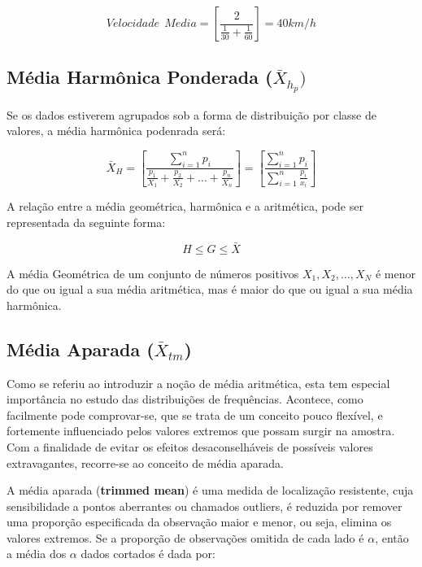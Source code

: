 \begin{equation}\label{exemplo_harmonica}
Velocidade \ \  Media = \left[\frac{2}{\frac{1}{30}+\frac{1}{60}} \right ]= 40 km/h
\end{equation}


\subsection{Média Harmônica Ponderada ($\bar{X}_{h_{p}})$}


Se os dados estiverem agrupados sob a forma de distribuição por classe de valores, a média harmônica podenrada será:


\begin{equation}\label{harmonicapondrada}
    \bar{X}_{H}= \left[  \frac{\sum_{i=1}^{n}p_{i}}{\frac{p_{1}}{X_{1}}+\frac{p_{2}}{X_{2}}+\ldots+\frac{p_{n}}{X_{n}}}\right ] = \left[  \frac{\sum_{i=1}^{n}p_{i}}{\sum_{i=1}^{n}\frac{p_{i}}{x_{i}}} \right ]
\end{equation}


A relação entre a média geométrica, harmônica e a aritmética, pode ser representada da seguinte forma:

        $$ H \leq G \leq \bar{X}  $$

A média Geométrica de um conjunto de números positivos $X_{1},X_{2},\ldots,X_{N}$ é menor do que ou igual a sua média aritmética, mas é maior do que ou igual a sua média harmônica.


\subsection{Média Aparada ($\bar{X}_{tm}$)}


\inic Como se referiu ao introduzir a noção de média aritmética, esta tem especial
importância no estudo das distribuições de frequências.
Acontece, como facilmente pode comprovar-se, que se trata de um conceito
pouco flexível, e fortemente influenciado pelos valores extremos que possam surgir na
amostra. Com a finalidade de evitar os efeitos desaconselháveis de possíveis valores
extravagantes, recorre-se ao conceito de média aparada. \vskip0.3cm


A média aparada (\textbf{trimmed mean}) é uma medida de localização resistente, cuja sensibilidade a pontos aberrantes ou chamados outliers, é reduzida por remover uma proporção especificada da observação maior e menor, ou seja, elimina os valores extremos. Se a proporção de observações omitida de cada lado é $\alpha$, então a média dos $\alpha$ dados cortados é dada por:

